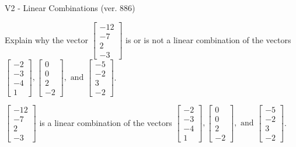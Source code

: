 \begin{exercise}
  \begin{exerciseTitle}V2 - Linear Combinations (ver. 886)\end{exerciseTitle}
  \begin{exerciseStatement}
    Explain why the vector \(\left[\begin{array}{c}
-12 \\
-7 \\
2 \\
-3
\end{array}\right]\)  is or is not a linear 
	combination of the vectors \(\left[\begin{array}{c}
-2 \\
-3 \\
-4 \\
1
\end{array}\right] , \left[\begin{array}{c}
0 \\
0 \\
2 \\
-2
\end{array}\right] , \text{ and } \left[\begin{array}{c}
-5 \\
-2 \\
3 \\
-2
\end{array}\right]\).
	


  \end{exerciseStatement}
  \begin{exerciseAnswer}
   \(\left[\begin{array}{c}
-12 \\
-7 \\
2 \\
-3
\end{array}\right]\) 
  	 is  
	a linear combination of the vectors \(\left[\begin{array}{c}
-2 \\
-3 \\
-4 \\
1
\end{array}\right] , \left[\begin{array}{c}
0 \\
0 \\
2 \\
-2
\end{array}\right] , \text{ and } \left[\begin{array}{c}
-5 \\
-2 \\
3 \\
-2
\end{array}\right]\).

	
  


  \end{exerciseAnswer}
\end{exercise}